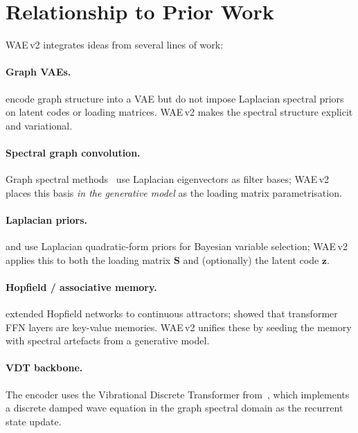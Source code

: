 \documentclass[11pt,a4paper]{article}
\newcommand{\bS}{\bm{S}}
\newcommand{\bz}{\bm{z}}
\begin{document}
\section{Relationship to Prior Work}
\label{sec:related}

WAE\,v2 integrates ideas from several lines of work:

\paragraph{Graph VAEs.}  \citet{kipf2016vgae} encode graph structure
into a VAE but do not impose Laplacian spectral priors on latent codes or
loading matrices.  WAE\,v2 makes the spectral structure explicit and
variational.

\paragraph{Spectral graph convolution.}  Graph spectral methods~\citep{defferrard2016chebynet}
use Laplacian eigenvectors as filter bases; WAE\,v2 places this basis \emph{in
the generative model} as the loading matrix parametrisation.

\paragraph{Laplacian priors.}  \citet{rao2008laplacian} and
\citet{slawski2015lapprior} use Laplacian quadratic-form priors for Bayesian
variable selection; WAE\,v2 applies this to both the loading matrix $\bS$
and (optionally) the latent code $\bz$.

\paragraph{Hopfield / associative memory.}  \citet{ramsauer2020hopfield}
extended Hopfield networks to continuous attractors; \citet{geva2021ffn} showed
that transformer FFN layers are key-value memories.  WAE\,v2 unifies these by
seeding the memory with spectral artefacts from a generative model.

\paragraph{VDT backbone.}  The encoder uses the Vibrational Discrete Transformer
from~\citet{moriondo2026vdt}, which implements a discrete damped wave equation
in the graph spectral domain as the recurrent state update.
\end{document}
